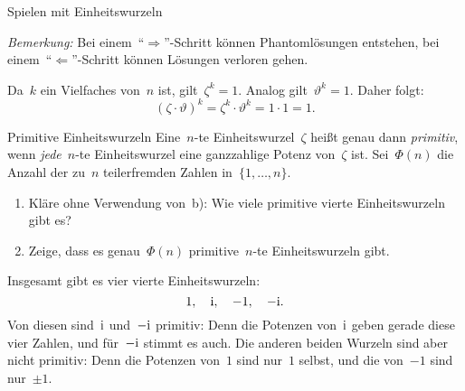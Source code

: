 \documentclass{algblatt}
\begin{document}
\begin{aufgabe}{Spielen mit Einheitswurzeln}
\begin{loesungE}
\emph{Bemerkung:} Bei einem~"`$\Rightarrow$"'-Schritt können Phantomlösungen
entstehen, bei einem~"`$\Leftarrow$"'-Schritt können Lösungen verloren gehen.

\item Da~$k$ ein Vielfaches von~$n$ ist, gilt~$\zeta^k = 1$. Analog
gilt~$\vartheta^k = 1$. Daher folgt:
\[ (\zeta \cdot \vartheta)^k = \zeta^k \cdot \vartheta^k = 1 \cdot 1 = 1. \]
\end{loesungE}
\end{aufgabe}

\begin{aufgabe}{Primitive Einheitswurzeln}
Eine~$n$-te Einheitswurzel~$\zeta$ heißt genau dann \emph{primitiv}, wenn
\emph{jede}~$n$-te Einheitswurzel eine ganzzahlige Potenz von~$\zeta$ ist.
Sei~$\Phi(n)$ die Anzahl der zu~$n$ teilerfremden Zahlen
in~$\{1,\ldots,n\}$.
\begin{enumerate}
\item Kläre ohne Verwendung von~b): Wie viele primitive vierte Einheitswurzeln gibt es?
\item Zeige, dass es genau~$\Phi(n)$ primitive~$n$-te
Einheitswurzeln gibt.
\end{enumerate}
\begin{loesungE}
\item Insgesamt gibt es vier vierte Einheitswurzeln:
\[ 1,\quad \mathrm{i},\quad -1,\quad -\mathrm{i}. \]
Von diesen sind~$\mathrm{i}$ und~$-\mathrm{i}$ primitiv: Denn die Potenzen von~$\mathrm{i}$ geben
gerade diese vier Zahlen, und für~$-\mathrm{i}$ stimmt es auch. Die anderen beiden
Wurzeln sind aber nicht primitiv: Denn die Potenzen von~$1$ sind nur~$1$
selbst, und die von~$-1$ sind nur~$\pm 1$.
\end{loesungE}
\end{aufgabe}
\end{document}
